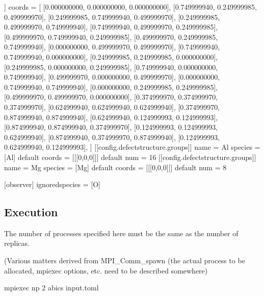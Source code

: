 \documentclass[letterpaper,10pt,english]{sphinxmanual}
\begin{document}
\begin{sphinxVerbatim}[commandchars=\\\{\}]
[[config.defect\PYGZus{}structure]]
coords = [
     [0.000000000, 0.000000000, 0.000000000],
     [0.749999940, 0.249999985, 0.499999970],
     [0.249999985, 0.749999940, 0.499999970],
     [0.249999985, 0.499999970, 0.749999940],
     [0.749999940, 0.499999970, 0.249999985],
     [0.499999970, 0.749999940, 0.249999985],
     [0.499999970, 0.249999985, 0.749999940],
     [0.000000000, 0.499999970, 0.499999970],
     [0.749999940, 0.749999940, 0.000000000],
     [0.249999985, 0.249999985, 0.000000000],
     [0.249999985, 0.000000000, 0.249999985],
     [0.749999940, 0.000000000, 0.749999940],
     [0.499999970, 0.000000000, 0.499999970],
     [0.000000000, 0.749999940, 0.749999940],
     [0.000000000, 0.249999985, 0.249999985],
     [0.499999970, 0.499999970, 0.000000000],
     [0.374999970, 0.374999970, 0.374999970],
     [0.624999940, 0.624999940, 0.624999940],
     [0.374999970, 0.874999940, 0.874999940],
     [0.624999940, 0.124999993, 0.124999993],
     [0.874999940, 0.874999940, 0.374999970],
     [0.124999993, 0.124999993, 0.624999940],
     [0.874999940, 0.374999970, 0.874999940],
     [0.124999993, 0.624999940, 0.124999993],
     ]
[[config.defect\PYGZus{}structure.groups]]
name = \PYGZsq{}Al\PYGZsq{}
\PYGZsh{} species = [\PYGZsq{}Al\PYGZsq{}]    \PYGZsh{} default
\PYGZsh{} coords = [[[0,0,0]]]  \PYGZsh{} default
num = 16
[[config.defect\PYGZus{}structure.groups]]
name = \PYGZsq{}Mg\PYGZsq{}
\PYGZsh{} species = [\PYGZsq{}Mg\PYGZsq{}]    \PYGZsh{} default
\PYGZsh{} coords = [[[0,0,0]]]  \PYGZsh{} default
num = 8


[observer]
ignored\PYGZus{}species = [\PYGZsq{}O\PYGZsq{}]
\end{sphinxVerbatim}


\subsection{Execution}
\label{\detokenize{how_to_use/basic_usage:execution}}
The number of processes specified here must be the same as the number of replicas.

(Various matters derived from MPI\_Comm\_spawn (the actual process to be allocated, mpiexec options, etc. need to be described somewhere)

\begin{sphinxVerbatim}[commandchars=\\\{\}]
\PYGZdl{} mpiexec \PYGZhy{}np 2 abics input.toml
\end{sphinxVerbatim}
\end{document}
